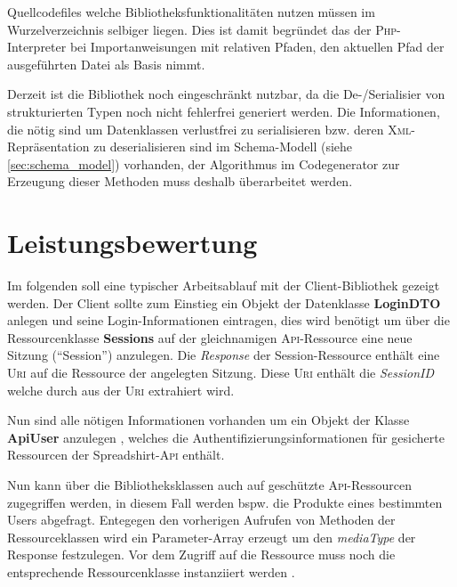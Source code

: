 Quellcodefiles welche Bibliotheksfunktionalitäten nutzen müssen im Wurzelverzeichnis selbiger liegen. Dies ist damit begründet das der \textsc{Php}-Interpreter bei Importanweisungen mit relativen Pfaden, den aktuellen Pfad der ausgeführten Datei als Basis nimmt.

Derzeit ist die Bibliothek noch eingeschränkt nutzbar, da die De-/Serialisier von strukturierten Typen noch nicht fehlerfrei generiert werden. Die Informationen, die nötig sind um Datenklassen verlustfrei zu serialisieren bzw. deren \textsc{Xml}-Repräsentation zu deserialisieren sind im Schema-Modell (siehe \cref{sec:schema_model}) vorhanden, der Algorithmus im Codegenerator zur Erzeugung dieser Methoden muss deshalb überarbeitet werden.

\section{Leistungsbewertung}
\label{sec:performance_measurement}

Im folgenden soll eine typischer Arbeitsablauf mit der Client-Bibliothek gezeigt werden. Der Client sollte zum Einstieg ein Objekt der Datenklasse \textbf{LoginDTO} anlegen  und seine Login-Informationen eintragen, dies wird benötigt um über die Ressourcenklasse \textbf{Sessions} auf der gleichnamigen \textsc{Api}-Ressource eine neue Sitzung (\enquote{Session}) anzulegen.
Die \emph{Response} der Session-Ressource enthält eine \textsc{Uri} auf die Ressource der angelegten Sitzung. Diese \textsc{Uri} enthält die \emph{SessionID} welche durch  aus der \textsc{Uri} extrahiert wird.

Nun sind alle nötigen Informationen vorhanden um ein Objekt der Klasse \textbf{ApiUser} anzulegen , welches die Authentifizierungsinformationen für gesicherte Ressourcen der Spreadshirt-\textsc{Api} enthält.

Nun kann über die Bibliotheksklassen auch auf geschützte \textsc{Api}-Ressourcen zugegriffen werden, in diesem Fall werden bspw. die Produkte eines bestimmten Users abgefragt. Entegegen den vorherigen Aufrufen von Methoden der Ressourceklassen wird ein Parameter-Array erzeugt  um den \emph{mediaType} der Response festzulegen.
Vor dem Zugriff auf die Ressource muss noch die entsprechende Ressourcenklasse instanziiert werden .


